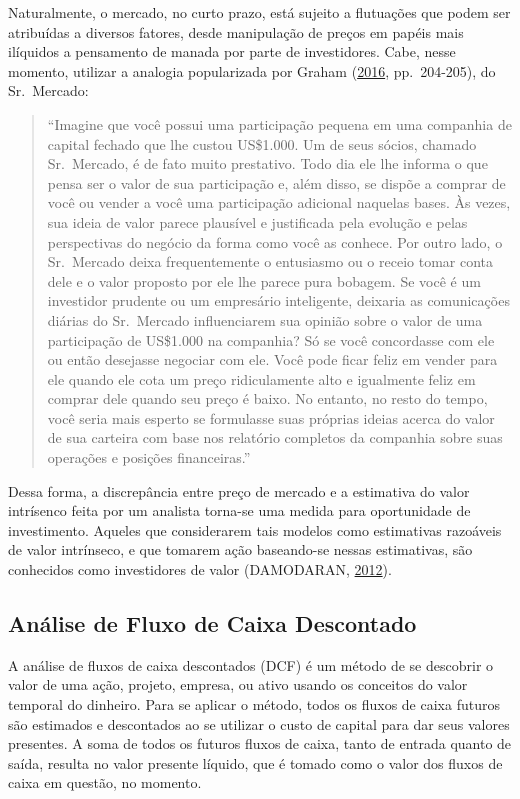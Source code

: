 \documentclass[grad,numbers]{coppe}
\begin{document}
  Naturalmente, o mercado, no curto prazo, está sujeito a flutuações que podem ser atribuídas a diversos fatores, desde manipulação de preços em papéis mais ilíquidos a pensamento de manada por parte de investidores. Cabe, nesse momento, utilizar a analogia popularizada por Graham (\protect\hyperlink{ref-graham2016}{2016}, pp.~204-205), do Sr.~Mercado:
  \begin{quote}
  ``Imagine que você possui uma participação pequena em uma companhia de capital fechado que lhe custou US\$1.000. Um de seus sócios, chamado Sr.~Mercado, é de fato muito prestativo. Todo dia ele lhe informa o que pensa ser o valor de sua participação e, além disso, se dispõe a comprar de você ou vender a você uma participação adicional naquelas bases. Às vezes, sua ideia de valor parece plausível e justificada pela evolução e pelas perspectivas do negócio da forma como você as conhece. Por outro lado, o Sr.~Mercado deixa frequentemente o entusiasmo ou o receio tomar conta dele e o valor proposto por ele lhe parece pura bobagem. Se você é um investidor prudente ou um empresário inteligente, deixaria as comunicações diárias do Sr.~Mercado influenciarem sua opinião sobre o valor de uma participação de US\$1.000 na companhia? Só se você concordasse com ele ou então desejasse negociar com ele. Você pode ficar feliz em vender para ele quando ele cota um preço ridiculamente alto e igualmente feliz em comprar dele quando seu preço é baixo. No entanto, no resto do tempo, você seria mais esperto se formulasse suas próprias ideias acerca do valor de sua carteira com base nos relatório completos da companhia sobre suas operações e posições financeiras.''
  \end{quote}
  Dessa forma, a discrepância entre preço de mercado e a estimativa do valor intrísenco feita por um analista torna-se uma medida para oportunidade de investimento. Aqueles que considerarem tais modelos como estimativas razoáveis de valor intrínseco, e que tomarem ação baseando-se nessas estimativas, são conhecidos como investidores de valor (DAMODARAN, \protect\hyperlink{ref-damodaran2012}{2012}).

  \hypertarget{anuxe1lise-de-fluxo-de-caixa-descontado}{%
  \subsection{Análise de Fluxo de Caixa Descontado}\label{anuxe1lise-de-fluxo-de-caixa-descontado}}

  A análise de fluxos de caixa descontados (DCF) é um método de se descobrir o valor de uma ação, projeto, empresa, ou ativo usando os conceitos do valor temporal do dinheiro. Para se aplicar o método, todos os fluxos de caixa futuros são estimados e descontados ao se utilizar o custo de capital para dar seus valores presentes. A soma de todos os futuros fluxos de caixa, tanto de entrada quanto de saída, resulta no valor presente líquido, que é tomado como o valor dos fluxos de caixa em questão, no momento.
\end{document}
